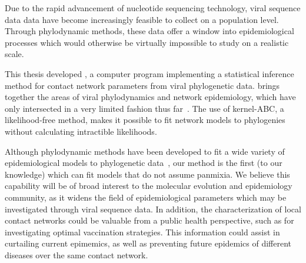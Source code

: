 Due to the rapid advancement of nucleotide sequencing technology, viral
sequence data data have become increasingly feasible to collect on a population
level. Through phylodynamic methods, these data offer a window into
epidemiological processes which would otherwise be virtually impossible to
study on a realistic scale. 

This thesis developed , a computer program implementing a
statistical inference method for contact network parameters from viral
phylogenetic data.  brings together the areas of viral
phylodynamics and network epidemiology, which have only intersected in a very
limited fashion thus far~\autocite{welch2011statistical}. The use of
kernel-\gls{ABC}, a likelihood-free method, makes it possible to fit network
models to phylogenies without calculating intractible likelihoods.

Although phylodynamic methods have been developed to fit a wide variety of
epidemiological models to phylogenetic data~\autocite{volz2012complex,
rasmussen2014phylodynamic}, our method is the first (to our knowledge) which
can fit models that do not assume panmixia. We believe this capability will be
of broad interest to the molecular evolution and epidemiology community, as it
widens the field of epidemiological parameters which may be investigated
through viral sequence data. In addition, the characterization of local contact
networks could be valuable from a public health perspective, such as for
investigating optimal vaccination strategies. This information could assist in
curtailing current epimemics, as well as preventing future epidemics of
different diseases over the same contact network.
